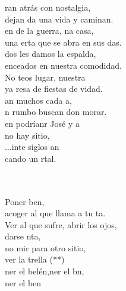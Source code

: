 \documentclass[12pt]{article}
\begin{document}
\begin{multicols*}{2}
\begin{cancion}%
	ran atrás con nostalgia,\\
	dejan da una vida y caminan.\\
	en de la guerra, na casa,\\
	una erta que se abra en sus das.\\
	dos les damos la espalda,\\
	enceados en nuestra comodidad.\\
	No teos lugar, nuestra \\
	ya resa de fiestas de vidad.\\
	an muchos cada a, \\
	n rumbo buscan don morar.\\
	en podríanr José y a\\
	no hay sitio,\\
	...inte siglos an\\
	cando un rtal.\\\jump\\
	\begin{chorus}%
	     \\
	Poner ben, \\
	acoger al que llama a tu ta.\\
Ver al que sufre, abrir los ojos,\\
	darse nta,\\
	no mir para otro sitio, \\
	ver la trella (**)\\
	ner el belén,ner el bn,\\
	ner el ben   \\
	\end{chorus}%
	\jump\\

\end{cancion}
\end{multicols*}
\end{document}
